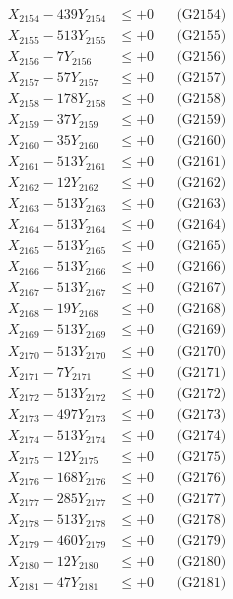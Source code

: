 \documentclass[a4paper,10pt]{article}
\begin{document}
{\begin{align}
X_{2154} - 439Y_{2154} &\leq +0 && \text{(G2154)} \\
X_{2155} - 513Y_{2155} &\leq +0 && \text{(G2155)} \\
X_{2156} - 7Y_{2156} &\leq +0 && \text{(G2156)} \\
X_{2157} - 57Y_{2157} &\leq +0 && \text{(G2157)} \\
X_{2158} - 178Y_{2158} &\leq +0 && \text{(G2158)} \\
X_{2159} - 37Y_{2159} &\leq +0 && \text{(G2159)} \\
X_{2160} - 35Y_{2160} &\leq +0 && \text{(G2160)} \\
\allowbreak
X_{2161} - 513Y_{2161} &\leq +0 && \text{(G2161)} \\
X_{2162} - 12Y_{2162} &\leq +0 && \text{(G2162)} \\
X_{2163} - 513Y_{2163} &\leq +0 && \text{(G2163)} \\
X_{2164} - 513Y_{2164} &\leq +0 && \text{(G2164)} \\
X_{2165} - 513Y_{2165} &\leq +0 && \text{(G2165)} \\
X_{2166} - 513Y_{2166} &\leq +0 && \text{(G2166)} \\
X_{2167} - 513Y_{2167} &\leq +0 && \text{(G2167)} \\
X_{2168} - 19Y_{2168} &\leq +0 && \text{(G2168)} \\
X_{2169} - 513Y_{2169} &\leq +0 && \text{(G2169)} \\
X_{2170} - 513Y_{2170} &\leq +0 && \text{(G2170)} \\
\allowbreak
X_{2171} - 7Y_{2171} &\leq +0 && \text{(G2171)} \\
X_{2172} - 513Y_{2172} &\leq +0 && \text{(G2172)} \\
X_{2173} - 497Y_{2173} &\leq +0 && \text{(G2173)} \\
X_{2174} - 513Y_{2174} &\leq +0 && \text{(G2174)} \\
X_{2175} - 12Y_{2175} &\leq +0 && \text{(G2175)} \\
X_{2176} - 168Y_{2176} &\leq +0 && \text{(G2176)} \\
X_{2177} - 285Y_{2177} &\leq +0 && \text{(G2177)} \\
X_{2178} - 513Y_{2178} &\leq +0 && \text{(G2178)} \\
X_{2179} - 460Y_{2179} &\leq +0 && \text{(G2179)} \\
X_{2180} - 12Y_{2180} &\leq +0 && \text{(G2180)} \\
\allowbreak
X_{2181} - 47Y_{2181} &\leq +0 && \text{(G2181)} \\

\end{align}}
\end{document}
